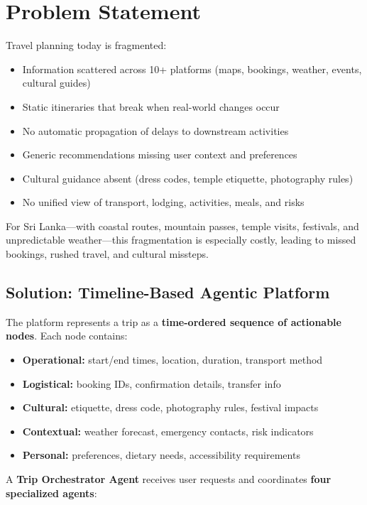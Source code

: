 \documentclass[11pt]{article}
\begin{document}
\section{Problem Statement}

Travel planning today is fragmented:
\begin{itemize}
    \item Information scattered across 10+ platforms (maps, bookings, weather, events, cultural guides)
    \item Static itineraries that break when real-world changes occur
    \item No automatic propagation of delays to downstream activities
    \item Generic recommendations missing user context and preferences
    \item Cultural guidance absent (dress codes, temple etiquette, photography rules)
    \item No unified view of transport, lodging, activities, meals, and risks
\end{itemize}

For Sri Lanka—with coastal routes, mountain passes, temple visits, festivals, and unpredictable weather—this fragmentation is especially costly, leading to missed bookings, rushed travel, and cultural missteps.

\subsection{Solution: Timeline-Based Agentic Platform}

The platform represents a trip as a \textbf{time-ordered sequence of actionable nodes}. Each node contains:
\begin{itemize}
    \item \textbf{Operational:} start/end times, location, duration, transport method
    \item \textbf{Logistical:} booking IDs, confirmation details, transfer info
    \item \textbf{Cultural:} etiquette, dress code, photography rules, festival impacts
    \item \textbf{Contextual:} weather forecast, emergency contacts, risk indicators
    \item \textbf{Personal:} preferences, dietary needs, accessibility requirements
\end{itemize}

A \textbf{Trip Orchestrator Agent} receives user requests and coordinates \textbf{four specialized agents}:
\end{document}
